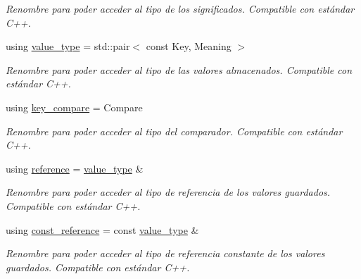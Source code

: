 \begin{DoxyCompactItemize}
\begin{DoxyCompactList}\small\item\em Renombre para poder acceder al tipo de los significados. Compatible con estándar C++. \end{DoxyCompactList}\item 
\mbox{\label{classaed2_1_1map_a719db98e0ff9a837610f76be33264680}} 
using \hyperlink{classaed2_1_1map_a719db98e0ff9a837610f76be33264680}{value\+\_\+type} = std\+::pair$<$ const Key, Meaning $>$
\begin{DoxyCompactList}\small\item\em Renombre para poder acceder al tipo de las valores almacenados. Compatible con estándar C++. \end{DoxyCompactList}\item 
\mbox{\label{classaed2_1_1map_a3efa081d3379ab76f33a5ef9fe697523}} 
using \hyperlink{classaed2_1_1map_a3efa081d3379ab76f33a5ef9fe697523}{key\+\_\+compare} = Compare
\begin{DoxyCompactList}\small\item\em Renombre para poder acceder al tipo del comparador. Compatible con estándar C++. \end{DoxyCompactList}\item 
\mbox{\label{classaed2_1_1map_af4f147533b3c0207ab036c86ce13ec0d}} 
using \hyperlink{classaed2_1_1map_af4f147533b3c0207ab036c86ce13ec0d}{reference} = \hyperlink{classaed2_1_1map_a719db98e0ff9a837610f76be33264680}{value\+\_\+type} \&
\begin{DoxyCompactList}\small\item\em Renombre para poder acceder al tipo de referencia de los valores guardados. Compatible con estándar C++. \end{DoxyCompactList}\item 
\mbox{\label{classaed2_1_1map_a277080d3db76f19df9319ecba16475a9}} 
using \hyperlink{classaed2_1_1map_a277080d3db76f19df9319ecba16475a9}{const\+\_\+reference} = const \hyperlink{classaed2_1_1map_a719db98e0ff9a837610f76be33264680}{value\+\_\+type} \&
\begin{DoxyCompactList}\small\item\em Renombre para poder acceder al tipo de referencia constante de los valores guardados. Compatible con estándar C++. \end{DoxyCompactList}\item 

\end{DoxyCompactItemize}
